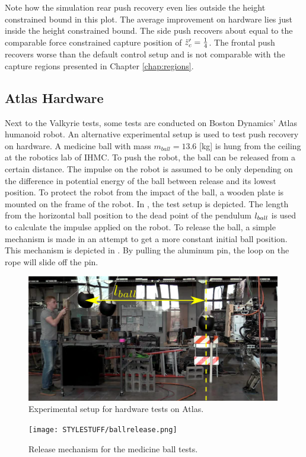 Note how the simulation rear push recovery even lies outside the height constrained bound in this plot. The average improvement on hardware lies just inside the height constrained bound. The side push recovers about equal to the comparable force constrained capture position of $\ddot{z}_{c}'=\frac{1}{4}$. The frontal push recovers worse than the default control setup and is not comparable with the capture regions presented in Chapter \ref{chap:regions}.

\subsection{Atlas Hardware}
Next to the Valkyrie tests, some tests are conducted on Boston Dynamics' Atlas humanoid robot. An alternative experimental setup is used to test push recovery on hardware. A medicine ball with mass $m_{ball}=13.6$ [kg] is hung from the ceiling at the robotics lab of \ac{IHMC}. To push the robot, the ball can be released from a certain distance. The impulse on the robot is assumed to be only depending on the difference in potential energy of the ball between release and its lowest position. To protect the robot from the impact of the ball, a wooden plate is mounted on the frame of the robot. In , the test setup is depicted. The length from the horizontal ball position to the dead point of the pendulum $l_{ball}$ is used to calculate the impulse applied on the robot. To release the ball, a simple mechanism is made in an attempt to get a more constant initial ball position. This mechanism is depicted in . By pulling the aluminum pin, the loop on the rope will slide off the pin.
\begin{figure}
\centering
\includegraphics[width=0.99\textwidth]{STYLESTUFF/atlassetup.png}
\caption{Experimental setup for hardware tests on Atlas.}
\label{fig:atlassetup}
\end{figure}
\begin{figure}
\centering
\texttt{[image: STYLESTUFF/ballrelease.png]}
\caption{Release mechanism for the medicine ball tests.}
\label{fig:ballrelease}
\end{figure}


